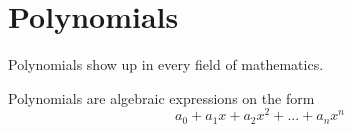 \documentclass{scrreprt}
\begin{document}
\section*{Polynomials}
Polynomials show up in every field of mathematics.
\begin{definition}[Polynomial]
    Polynomials are algebraic expressions on the form $$a_0 + a_1 x + a_2 x^2 + ... + a_n x^n$$
\end{definition}
\end{document}

